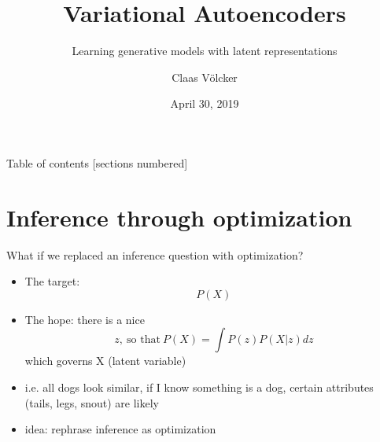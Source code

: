 \documentclass[10pt]{beamer}
\title{Variational Autoencoders}
\subtitle{Learning generative models with latent representations}
\date{April 30, 2019}
\author{Claas Völcker}
\institute{Deep Generative Models - SoSe 2019}
\begin{document}

\maketitle


\begin{frame}{Table of contents}
[sections numbered]
\tableofcontents[hideallsubsections]
\end{frame}


\section{Inference through optimization}

\begin{frame}{What if we replaced an inference question with optimization?}
    \begin{itemize}[<+->]
        \item The target: $$P(X)$$
        \item The hope: there is a nice $$z,~\text{so that}~P(X) = \int P(z)P(X|z)dz$$ which governs X (latent variable)
        \item i.e. all dogs look similar, if I know something is a dog, certain attributes (tails, legs, snout) are likely
        \item idea: rephrase inference as optimization
    \end{itemize}
\end{frame}

\end{document}
